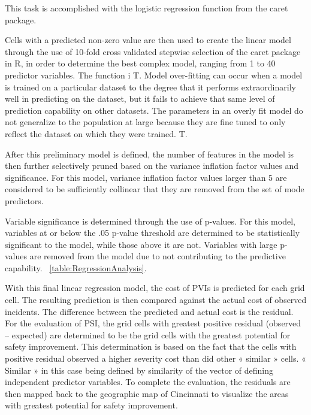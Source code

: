 \documentclass{llncs}
\begin{document}
This task is accomplished with the logistic regression function from the caret package. 

Cells with a predicted non-zero value are then used to create the linear model through the use of 10-fold cross validated stepwise selection of the caret package in R, in order to determine the best complex model, ranging from 1 to 40 predictor variables. The function i T. Model over-fitting can occur when a model is trained on a particular dataset to the degree that it performs extraordinarily well in predicting on the dataset, but it fails to achieve that same level of prediction capability on other datasets. The parameters in an overly fit model do not generalize to the population at large because they are fine tuned to only reflect the dataset on which they were trained. T.

After this preliminary model is defined,  the number of features in the model is then further  selectively pruned based on the variance inflation factor values and significance. For this model, variance inflation factor values larger than 5 are considered to be sufficiently collinear that they are removed from the set of mode predictors.


Variable significance is determined through the use of p-values. For this model, variables at or below the .05 p-value threshold are determined to be statistically significant to the model, while those above it are not. Variables with large p-values are removed from the model due to not contributing to the predictive capability.  ~\ref{table:RegressionAnalysis}. 

With this final linear regression model, the cost of PVIs is predicted for each grid cell. The resulting prediction is then compared against the actual cost of observed incidents. The difference between the predicted and actual cost is the residual. For the evaluation of PSI, the grid cells with greatest positive residual (observed – expected) are determined to be the grid cells with the greatest potential for safety improvement. This determination is based on the fact that the cells with positive residual observed a higher severity cost than did other « similar » cells. « Similar » in this case being defined by similarity of the vector of defining independent predictor variables. To complete the evaluation, the residuals are then mapped back to the geographic map of Cincinnati to visualize the areas with greatest potential for safety improvement.
\end{document}
